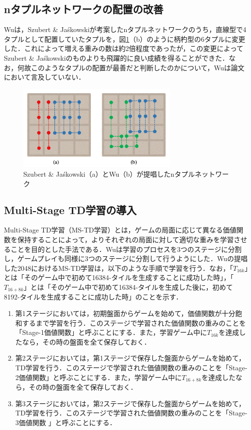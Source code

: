 \documentclass{suribt}
\begin{document}
\subsection{nタプルネットワークの配置の改善}
Wuは，Szubert \& Ja\'{s}kowskiが考案したnタプルネットワークのうち，直線型で4タプルとして配置していたタプルを，図\ref{figure_002}（b）のように柄杓型の6タプルに変更した．これによって増える重みの数は約2倍程度であったが，この変更によってSzubert \& Ja\'{s}kowskiのものよりも飛躍的に良い成績を得ることができた．なお，何故このようなタプルの配置が最善だと判断したのかについて，Wuは論文において言及していない．

\begin{figure}[t]
	\begin{center}
	\includegraphics[width=8cm]{figure_002.png}
	\caption{Szubert \& Ja\'{s}kowski（a）とWu（b）が提唱したnタプルネットワーク}
	\label{figure_002}
	\end{center}
\end{figure}

\subsection{Multi-Stage TD学習の導入}
Multi-Stage TD学習（MS-TD学習）とは，ゲームの局面に応じて異なる価値関数を保持することによって，よりそれぞれの局面に対して適切な重みを学習させることを目的とした手法である．Wuは学習のプロセスを3つのステージに分割し，ゲームプレイも同様に3つのステージに分割して行うようにした．Wuの提唱した2048におけるMS-TD学習は，以下のような手順で学習を行う．なお，「$T_{16k}$」とは「そのゲーム中で初めて16384-タイルを生成することに成功した時」，「$T_{16+8k}$」とは「そのゲーム中で初めて16384-タイルを生成した後に，初めて8192-タイルを生成することに成功した時」のことを示す．

\begin{enumerate}
\item 第1ステージにおいては，初期盤面からゲームを始めて，価値関数が十分飽和するまで学習を行う．このステージで学習された価値関数の重みのことを「Stage-1価値関数」と呼ぶことにする．また，学習ゲーム中に$T_{16k}$を達成したなら，その時の盤面を全て保存しておく．
\item 第2ステージにおいては，第1ステージで保存した盤面からゲームを始めて，TD学習を行う．このステージで学習された価値関数の重みのことを「Stage-2価値関数」と呼ぶことにする．また，学習ゲーム中に$T_{16+8k}$を達成したなら，その時の盤面を全て保存しておく．
\item 第3ステージにおいては，第2ステージで保存した盤面からゲームを始めて，TD学習を行う．このステージで学習された価値関数の重みのことを「Stage-3価値関数
」と呼ぶことにする．
\end{enumerate}
\end{document}
